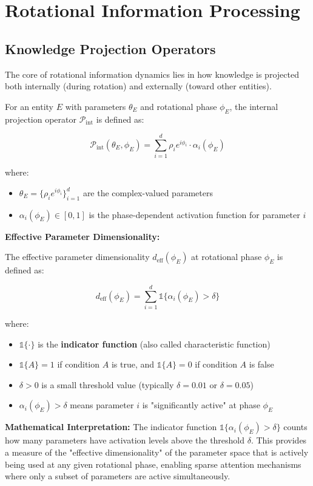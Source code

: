 \section{Rotational Information Processing}

\subsection{Knowledge Projection Operators}

The core of rotational information dynamics lies in how knowledge is projected both internally (during rotation) and externally (toward other entities).

\begin{definition}
For an entity $E$ with parameters $\theta_E$ and rotational phase $\phi_E$, the internal projection operator $\mathcal{P}_{\text{int}}$ is defined as:

\begin{equation}
\mathcal{P}_{\text{int}}(\theta_E, \phi_E) = \sum_{i=1}^d \rho_i e^{i\phi_i} \cdot \alpha_i(\phi_E) 
\end{equation}

where:
\begin{itemize}
    \item $\theta_E = \{\rho_i e^{i\phi_i}\}_{i=1}^d$ are the complex-valued parameters
    \item $\alpha_i(\phi_E) \in [0,1]$ is the phase-dependent activation function for parameter $i$
\end{itemize}

\textbf{Effective Parameter Dimensionality:}

The effective parameter dimensionality $d_{\text{eff}}(\phi_E)$ at rotational phase $\phi_E$ is defined as:

\begin{equation}
d_{\text{eff}}(\phi_E) = \sum_{i=1}^d \mathbb{1}\{\alpha_i(\phi_E) > \delta\}
\end{equation}

where:
\begin{itemize}
    \item $\mathbb{1}\{\cdot\}$ is the \textbf{indicator function} (also called characteristic function)
    \item $\mathbb{1}\{A\} = 1$ if condition $A$ is true, and $\mathbb{1}\{A\} = 0$ if condition $A$ is false
    \item $\delta > 0$ is a small threshold value (typically $\delta = 0.01$ or $\delta = 0.05$)
    \item $\alpha_i(\phi_E) > \delta$ means parameter $i$ is "significantly active" at phase $\phi_E$
\end{itemize}

\textbf{Mathematical Interpretation:}
The indicator function $\mathbb{1}\{\alpha_i(\phi_E) > \delta\}$ counts how many parameters have activation levels above the threshold $\delta$. This provides a measure of the "effective dimensionality" of the parameter space that is actively being used at any given rotational phase, enabling sparse attention mechanisms where only a subset of parameters are active simultaneously.
\end{definition}

